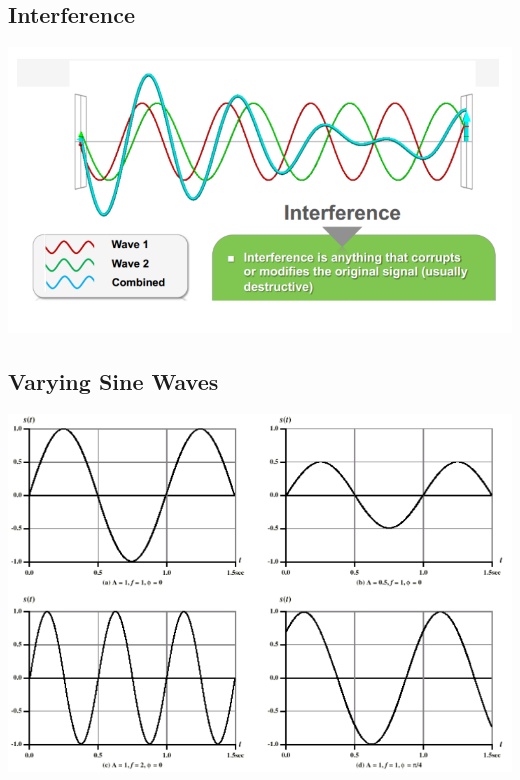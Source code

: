 \documentclass[11pt]{article}
\begin{document}
\subsection{Interference}
\includegraphics[width=\textwidth]{interference}
\subsection{Varying Sine Waves}
\includegraphics[width=\textwidth]{varying-sine-waves}
\end{document}
